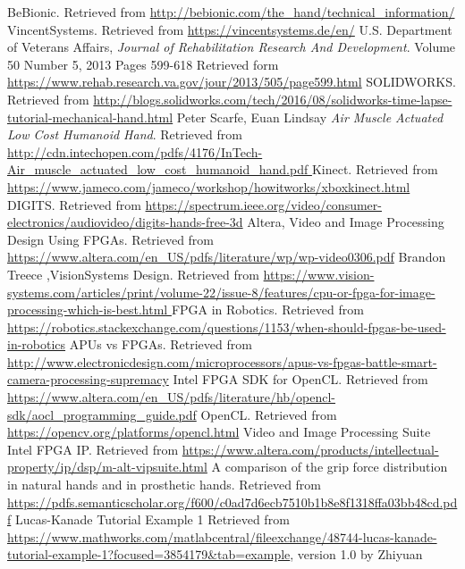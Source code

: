 \documentclass{article}
\begin{document}
\break
\begin{thebibliography}{1}
	 BeBionic. Retrieved from {\url{http://bebionic.com/the_hand/technical_information/}} 
	 VincentSystems. Retrieved from {\url{  https://vincentsystems.de/en/}} 
	 U.S. Department of Veterans Affairs, {\em Journal of Rehabilitation Research And Development}. Volume 50 Number 5, 2013
   Pages 599-618 Retrieved form {\url{https://www.rehab.research.va.gov/jour/2013/505/page599.html}}
	 SOLIDWORKS. Retrieved from {\url{ http://blogs.solidworks.com/tech/2016/08/solidworks-time-lapse-tutorial-mechanical-hand.html}}
	 Peter Scarfe, Euan Lindsay {\em Air Muscle Actuated Low Cost Humanoid Hand}. Retrieved from {\url{ http://cdn.intechopen.com/pdfs/4176/InTech-Air_muscle_actuated_low_cost_humanoid_hand.pdf
}} 
	 Kinect. Retrieved from {\url{https://www.jameco.com/jameco/workshop/howitworks/xboxkinect.html}}
	 DIGITS. Retrieved from {\url{https://spectrum.ieee.org/video/consumer-electronics/audiovideo/digits-hands-free-3d}}	
	 Altera, Video and Image Processing Design Using FPGAs. Retrieved from {\url{https://www.altera.com/en_US/pdfs/literature/wp/wp-video0306.pdf}}
	 Brandon Treece ,VisionSystems Design. Retrieved from {\url{https://www.vision-systems.com/articles/print/volume-22/issue-8/features/cpu-or-fpga-for-image-processing-which-is-best.html	}}
	 FPGA in Robotics. Retrieved from {\url{https://robotics.stackexchange.com/questions/1153/when-should-fpgas-be-used-in-robotics}}
	 APUs vs FPGAs. Retrieved from {\url{http://www.electronicdesign.com/microprocessors/apus-vs-fpgas-battle-smart-camera-processing-supremacy}}
	 Intel FPGA SDK for OpenCL. Retrieved from {\url{https://www.altera.com/en_US/pdfs/literature/hb/opencl-sdk/aocl_programming_guide.pdf}}
	 OpenCL. Retrieved from {\url{https://opencv.org/platforms/opencl.html}}
	 Video and Image Processing Suite Intel FPGA IP. Retrieved from {\url{https://www.altera.com/products/intellectual-property/ip/dsp/m-alt-vipsuite.html}}
	 A comparison of the grip force distribution in natural hands and in prosthetic hands. Retrieved from {\url{https://pdfs.semanticscholar.org/f600/c0ad7d6ecb7510b1b8e8f1318ffa03bb48cd.pdf}}
	 Lucas-Kanade Tutorial Example 1 Retrieved from {\url{https://www.mathworks.com/matlabcentral/fileexchange/48744-lucas-kanade-tutorial-example-1?focused=3854179&tab=example}}, version 1.0 by Zhiyuan



\end{thebibliography}
  
\end{document}
